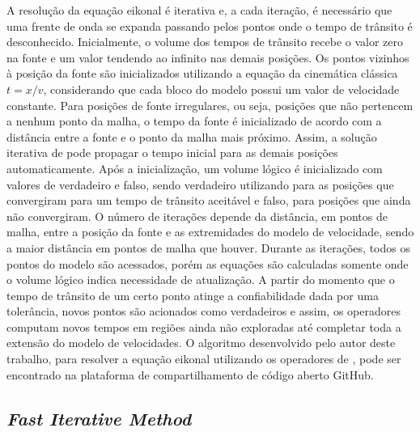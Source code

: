 A resolução da equação eikonal é iterativa e, a cada iteração, é necessário que uma frente de onda se expanda passando pelos pontos onde o tempo de trânsito é desconhecido. Inicialmente, o volume dos tempos de trânsito recebe o valor zero na fonte e um valor tendendo ao infinito nas demais posições. Os pontos vizinhos à posição da fonte são inicializados utilizando a equação da cinemática clássica $t = x / v$, considerando que cada bloco do modelo possui um valor de velocidade constante. Para posições de fonte irregulares, ou seja, posições que não pertencem a nenhum ponto da malha, o tempo da fonte é inicializado de acordo com a distância entre a fonte e o ponto da malha mais próximo. Assim, a solução iterativa de  pode propagar o tempo inicial para as demais posições automaticamente. Após a inicialização, um volume lógico é inicializado com valores de verdadeiro e falso, sendo verdadeiro utilizando para as posições que convergiram para um tempo de trânsito aceitável e falso, para posições que ainda não convergiram. O número de iterações depende da distância, em pontos de malha, entre a posição da fonte e as extremidades do modelo de velocidade, sendo a maior distância em pontos de malha que houver. Durante as iterações, todos os pontos do modelo são acessados, porém as equações são calculadas somente onde o volume lógico indica necessidade de atualização. A partir do momento que o tempo de trânsito de um certo ponto atinge a confiabilidade dada por uma tolerância, novos pontos são acionados como verdadeiros e assim, os operadores computam novos tempos em regiões ainda não exploradas até completar toda a extensão do modelo de velocidades. O algoritmo desenvolvido pelo autor deste trabalho, para resolver a equação eikonal utilizando os operadores de , pode ser encontrado na plataforma de compartilhamento de código aberto GitHub. 

\subsection{\textit{Fast Iterative Method}}


